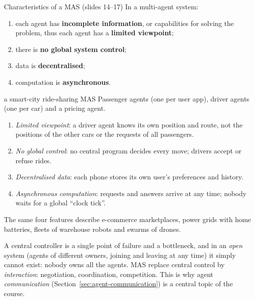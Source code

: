 \begin{nbdef}{Characteristics of a MAS (slides 14--17)}
In a multi-agent system:
\begin{enumerate}[nosep]
  \item each agent has \textbf{incomplete information}, or capabilities for solving the
        problem, thus each agent has a \textbf{limited viewpoint};
  \item there is \textbf{no global system control};
  \item data is \textbf{decentralised};
  \item computation is \textbf{asynchronous}.
\end{enumerate}
\end{nbdef}

\begin{nbexample}{a smart-city ride-sharing MAS}
\notinslides
Passenger agents (one per user app), driver agents (one per car) and a pricing agent.
\begin{enumerate}[nosep]
  \item \emph{Limited viewpoint}: a driver agent knows its own position and route, not the
        positions of the other cars or the requests of all passengers.
  \item \emph{No global control}: no central program decides every move; drivers accept or
        refuse rides.
  \item \emph{Decentralised data}: each phone stores its own user's preferences and history.
  \item \emph{Asynchronous computation}: requests and answers arrive at any time; nobody
        waits for a global ``clock tick''.
\end{enumerate}
The same four features describe e-commerce marketplaces, power grids with home batteries,
fleets of warehouse robots and swarms of drones.
\end{nbexample}

\begin{nbintuition}
A central controller is a single point of failure and a bottleneck, and in an \emph{open}
system (agents of different owners, joining and leaving at any time) it simply cannot exist:
nobody owns all the agents. MAS replace central control by \emph{interaction}: negotiation,
coordination, competition. This is why agent \emph{communication}
(Section~\ref{sec:agent-communication}) is a central topic of the course.
\end{nbintuition}
